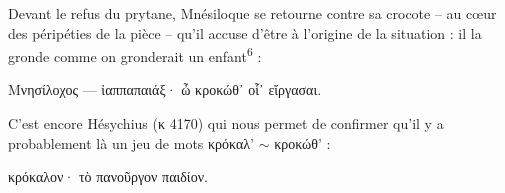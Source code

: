\documentclass[12pt]{book}%
\newcommand{\italique}[1]{\textit{#1}}%
\newcommand{\citComm}[1]{\begin{quoting}[vskip=0pt] #1 \end{quoting}}%
\newcommand{\latin}[1]{{\policeLat #1}}%
\newcommand{\marqueur}[1]{\textsuperscript{#1}}%
\newcommand{\eff}[1]{%
{\color{orange}#1}%
}%
\newenvironment{groupe}{%
\pstart%
\ledgroup%
}{%
\pend %
}%
\begin{document}
\begin{pages}
\begin{Leftside}
\begin{groupe}
{{Devant le refus du prytane, Mnésiloque se retourne contre sa crocote -- au cœur des péripéties de la pièce -- qu'il accuse d'être à l'origine de la situation : il la gronde comme on gronderait un enfant\marqueur{6} :%
\citComm{Μνησίλοχος --- ἰαππαπαιάξ· ὦ κροκώθ᾽ οἷ᾽ εἴργασαι.}%

C'est encore Hésychius (κ 4170) qui nous permet de confirmer qu'il y a probablement là un jeu de mots κρόκαλ' $\sim$ κροκώθ' :%
\citComm{κρόκαλον· τὸ πανοῦργον παιδίον.}%

%
}}
\end{groupe}
\end{Leftside}
\end{pages}
\end{document}
